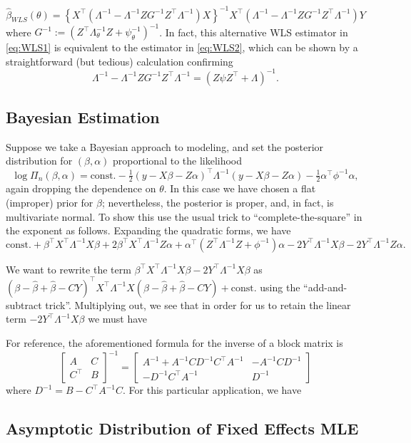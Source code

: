 \documentclass[
]{book}
\begin{document}
\begin{equation}
\hat\beta_{WLS}(\theta) = \left\{X^\top \left(\Lambda^{-1} - \Lambda^{-1}ZG^{-1}Z^\top \Lambda^{-1}\right) X\right\}^{-1}X^\top \left(\Lambda^{-1} - \Lambda^{-1}ZG^{-1}Z^\top \Lambda^{-1}\right)Y
\label{eq:WLS2}
\end{equation}
where \(G^{-1} := (Z^\top \Lambda_\theta^{-1}Z + \psi_\theta^{-1})^{-1}\).
In fact, this alternative WLS estimator in \eqref{eq:WLS1} is equivalent to the estimator in \eqref{eq:WLS2}, which can be shown by a straightforward (but tedious) calculation confirming\\
\[\Lambda^{-1} - \Lambda^{-1}ZG^{-1}Z^\top \Lambda^{-1} = \left(Z\psi Z^\top + \Lambda\right)^{-1}.\]

\hypertarget{bayesian-estimation}{%
\subsection{Bayesian Estimation}\label{bayesian-estimation}}

Suppose we take a Bayesian approach to modeling, and set the posterior distribution for \((\beta, \alpha)\) proportional to the likelihood
\[\log \Pi_n(\beta, \alpha) = \text{const.} - \tfrac12(y - X\beta - Z\alpha)^\top \Lambda^{-1}(y - X\beta - Z\alpha) - \tfrac12 \alpha^\top\phi^{-1}\alpha, \]
again dropping the dependence on \(\theta\). In this case we have chosen a flat (improper) prior for \(\beta\); nevertheless, the posterior is proper, and, in fact, is multivariate normal. To show this use the usual trick to ``complete-the-square'' in the exponent as follows. Expanding the quadratic forms, we have
\[\text{const.} + \beta^\top X^\top \Lambda^{-1}X \beta + 2\beta^\top X^\top \Lambda^{-1}Z\alpha + \alpha^\top(Z^\top \Lambda^{-1}Z + \phi^{-1})\alpha - 2Y^\top \Lambda^{-1}X\beta - 2Y^\top \Lambda^{-1}Z\alpha.\]

We want to rewrite the term \(\beta^\top X^\top \Lambda^{-1}X \beta - 2Y^\top \Lambda^{-1}X\beta\) as \((\beta - \hat\beta+\hat\beta - CY)^\top X^\top \Lambda^{-1}X(\beta - \hat\beta+\hat\beta - CY) + \text{const.}\) using the ``add-and-subtract trick''. Multiplying out, we see that in order for us to retain the linear term \(- 2Y^\top \Lambda^{-1}X\beta\) we must have

For reference, the aforementioned formula for the inverse of a block matrix is
\[\begin{bmatrix}
A & C\\
C^\top & B
\end{bmatrix}^{-1}  = \begin{bmatrix}
A^{-1} + A^{-1}CD^{-1}C^\top A^{-1} & -A^{-1}CD^{-1}\\
-D^{-1}C^\top A^{-1} & D^{-1}
\end{bmatrix}\]
where \(D^{-1} = B - C^\top A^{-1}C\). For this particular application, we have

\hypertarget{asymptotic-distribution-of-fixed-effects-mle}{%
\subsection{Asymptotic Distribution of Fixed Effects MLE}\label{asymptotic-distribution-of-fixed-effects-mle}}

  
\end{document}
